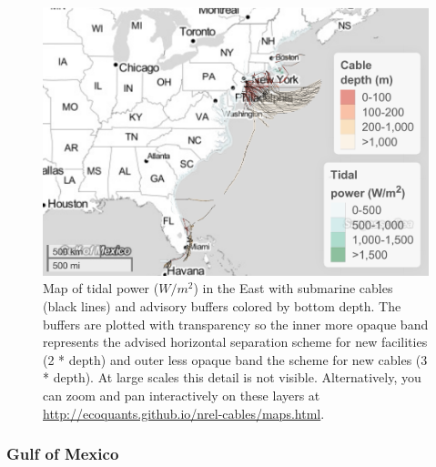 \documentclass[]{article}
\begin{document}
\begin{figure}
\centering
\includegraphics{report_files/figure-latex/mapTideEast-1.pdf}
\caption{\label{fig:mapTideEast}Map of tidal power (\(W/m^2\)) in the East
with submarine cables (black lines) and advisory buffers colored by
bottom depth. The buffers are plotted with transparency so the inner
more opaque band represents the advised horizontal separation scheme for
new facilities (2 * depth) and outer less opaque band the scheme for new
cables (3 * depth). At large scales this detail is not visible.
Alternatively, you can zoom and pan interactively on these layers at
\url{http://ecoquants.github.io/nrel-cables/maps.html}.}
\end{figure}

\hypertarget{gulf-of-mexico}{%
\subsubsection{Gulf of Mexico}\label{gulf-of-mexico}}
\end{document}
